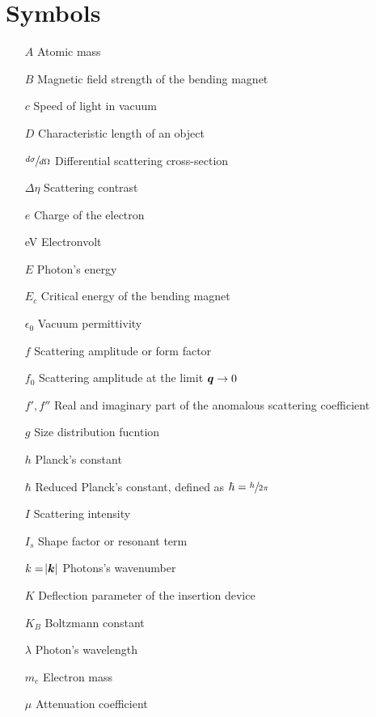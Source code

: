 \section*{Symbols}

\begin{itemize}

        \item[$A$] Atomic mass
        \item[$B$] Magnetic field strength of the bending magnet
        \item[$c$] Speed of light in vacuum     
        \item[$D$] Characteristic length of an object
        \item[$\sfrac{d\sigma}{d\Omega}$] Differential scattering cross-section   
        \item[$\Delta\eta$] Scattering contrast        
        \item[$e$] Charge of the electron  
        \item[eV] Electronvolt
        \item[$E$] Photon's energy
        \item[$E_c$] Critical energy of the bending magnet
        \item[$\epsilon_0$] Vacuum permittivity 
        \item[$f$] Scattering amplitude or form factor
        \item[$f_0$] Scattering amplitude at the limit $\bm{q}\rightarrow 0$
        \item[$f',f''$] Real and imaginary part of the anomalous scattering coefficient
        \item[$g$] Size distribution fucntion
        \item[$h$] Planck's constant          
        \item[$\hbar$] Reduced Planck's constant, defined as $\hbar = \sfrac{h}{2 \pi}$
        \item[$I$] Scattering intensity
        \item[$I_s$] Shape factor or resonant term
        \item[$k=\abs{\bm{k}}$] Photons's wavenumber
        \item[$K$] Deflection parameter of the insertion device
        \item[$K_B$] Boltzmann constant
        \item[$\lambda$] Photon's wavelength  
        \item[$m_e$] Electron mass
        \item[$\mu$] Attenuation coefficient

\end{itemize}
